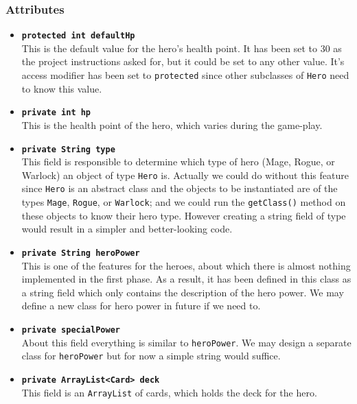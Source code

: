 \documentclass[a4paper]{article}
\begin{document}
\subsubsection{Attributes}
\begin{itemize}
	\item \textbf{\texttt{protected int defaultHp}}\\ This is the default value for the hero's health point. It has been set to 30 as the project instructions asked for, but it could be set to any other value. It's access modifier has been set to \texttt{protected} since other subclasses of \texttt{Hero} need to know this value.
	
	\item \textbf{\texttt{private int hp}}\\ This is the health point of the hero, which varies during the game-play.
	
	\item \textbf{\texttt{private String type}}\\
	 This field is responsible to determine which type of hero (Mage, Rogue, or Warlock) an object of type \texttt{Hero} is. Actually we could do without this feature since \texttt{Hero} is an abstract class and the objects to be instantiated are of the types \texttt{Mage}, \texttt{Rogue}, or \texttt{Warlock}; and we could run the \texttt{getClass()} method on these objects to know their hero type. However creating a string field of type would result in a simpler and better-looking code.
	
	\item \textbf{\texttt{private String heroPower}}\\
	This is one of the features for the heroes, about which there is almost nothing implemented in the first phase. As a result, it has been defined in this class as a string field which only contains the description of the hero power. We may define a new class for hero power in future if we need to.
	
	\item \textbf{\texttt{private  specialPower}}\\
	About this field everything is similar to \texttt{heroPower}. We may design a separate class for \texttt{heroPower} but for now a simple string would suffice.
	
	\item \textbf{\texttt{private ArrayList<Card> deck}}\\
	This field is an \texttt{ArrayList} of cards, which holds the deck for the hero.
	

\end{itemize}
\end{document}
